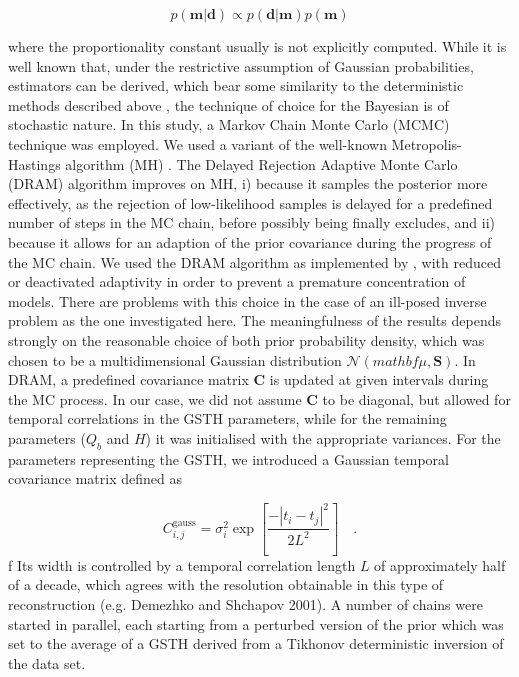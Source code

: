 \documentclass[cp]{copernicus}
\begin{document}
\begin{equation}\label{eqn:12}
p\left( {{\mathbf{m}}\left| {\mathbf{d}} \right.} \right) \propto p\left( 
{{\mathbf{d}}\left| {\mathbf{m}} \right.} \right)p\left( {\mathbf{m}} \right)
\end{equation} 

where the proportionality constant usually is not explicitly computed. While it is well known that, 
under the restrictive assumption of Gaussian probabilities, estimators can be derived, which bear 
some similarity to the deterministic methods described above \citep{Tarantola1982a,Tarantola1982b}, 
the technique of choice for the Bayesian is of stochastic nature. In this study, a Markov Chain 
Monte Carlo (MCMC) technique was employed. We used a variant of the well-known Metropolis-Hastings 
algorithm (MH) \citep{Metropolis1953a, Hastings1970a,Haario2006a}. The Delayed Rejection Adaptive 
Monte Carlo (DRAM) algorithm improves on MH, i) because it samples the posterior more effectively, 
as the rejection of low-likelihood samples is delayed for a predefined number of steps in the MC 
chain, before possibly being finally excludes, and ii) because it allows for an adaption of the 
prior covariance during the progress of the MC chain. We used the DRAM algorithm as implemented by 
\citet{Haario2006a}, with reduced or deactivated adaptivity in order to prevent a premature 
concentration of models. There are problems with this choice in the case of an ill-posed inverse 
problem as the one investigated here. The meaningfulness of the results depends strongly on the 
reasonable choice of both prior probability density, which was chosen to be a multidimensional 
Gaussian distribution $\mathcal{N}(mathbf{\mu},\mathbf{S})$. In DRAM, a predefined covariance matrix 
$\mathbf{C}$ is updated at given intervals during the MC process. In our case, we did not 
assume $\mathbf{C}$ to be diagonal, but allowed for temporal correlations in the GSTH parameters, 
while for the remaining parameters ($Q_b$ and $H$) it was initialised with the appropriate 
variances. For the parameters representing the GSTH, we introduced a Gaussian temporal covariance 
matrix defined as

\begin{equation}\label{eqn:13}
C_{i,j}^{{\text{gauss}}} = \sigma _i^2\exp \left[ {\frac{{ - {{\left| {{t_i} - 
{t_j}} \right|}^2}}}{{2{L^2}}}} \right] \quad .
\end{equation} 
 	f
Its width is controlled by a temporal correlation length $L$  of approximately 
half of a decade, which agrees with the resolution obtainable in this type of reconstruction (e.g. 
Demezhko and Shchapov 2001). A number of chains were started in parallel, each starting from a 
perturbed version of the prior which was set to the average of a GSTH derived from a Tikhonov 
deterministic inversion of the data set.
% 
\end{document}
